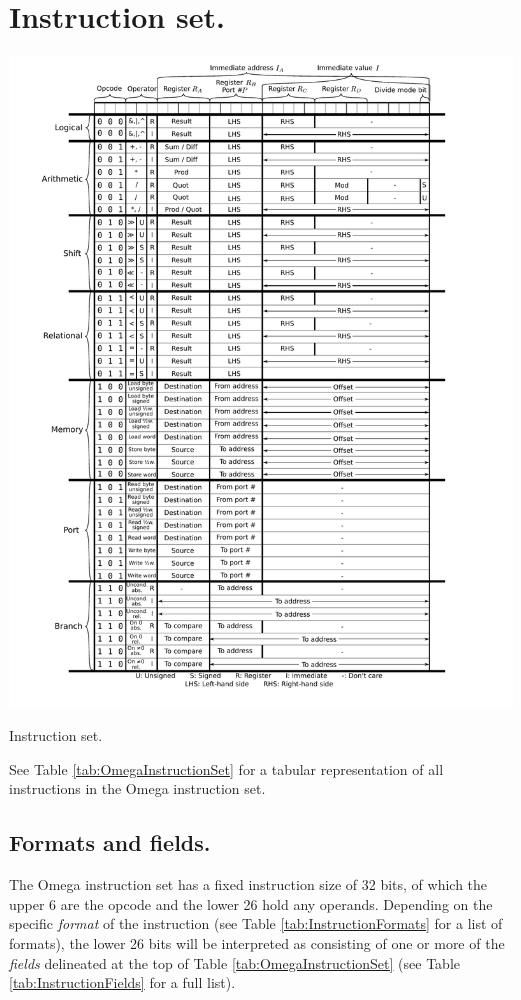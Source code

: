 \documentclass[12pt,english,twoside]{report}
\begin{document}
\section{Instruction set.}

\begin{table}[p]
  \begin{center}
  \includegraphics[width=6.5in]{../OmegaInstructionSet.pdf}
  \caption{\label{tab:OmegaInstructionSet} Instruction set.}
  \end{center}
\end{table}

See Table \ref{tab:OmegaInstructionSet} for a tabular representation
of all instructions in the Omega instruction set.

\subsection{Formats and fields.}

The Omega instruction set has a fixed instruction size of 32 bits, of
which the upper 6 are the opcode and the lower 26 hold any operands.
Depending on the specific \emph{format} of the instruction (see Table
\ref{tab:InstructionFormats} for a list of formats), the lower 26
bits will be interpreted as consisting of one or more of the
\emph{fields} delineated at the top of Table
\ref{tab:OmegaInstructionSet} (see Table \ref{tab:InstructionFields}
for a full list).
\end{document}
